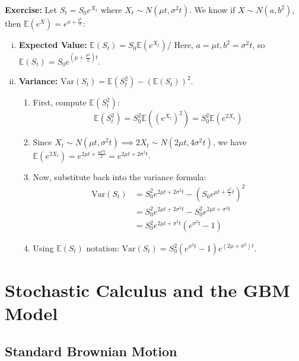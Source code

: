 \textbf{Exercise: } Let \(S_t = S_0 e^{X_t}\) where \(X_t \sim N(\mu t, \sigma^2 t)\). We know if \(X \sim N(a, b^2)\), then \(\mathbb{E}(e^X) = e^{a + \frac{b^2}{2}}\):
\begin{enumerate}[i.]
    \item \textbf{Expected Value: } \(\mathbb{E}(S_t) = S_0 \mathbb{E}(e^{X_t})\)/ Here, \(a = \mu t, b^2 = \sigma^2t\), so \(\mathbb{E}(S_t) = \boxed{S_0 e^{(\mu + \frac{\sigma^2}{2})t}}\).

    \item \textbf{Variance: } \(\text{Var}(S_t) = \mathbb{E}(S_t^2) - (\mathbb{E}(S_t))^2\).
    \begin{enumerate}
        \item First, compute \(\mathbb{E}(S_t^2)\):
        \begin{equation*}
        \mathbb{E}(S_t^2) = S_0^2 \mathbb{E}((e^{X_t})^2) = S_0^2 \mathbb{E}(e^{2X_t})
        \end{equation*}

        \item Since \(X_t \sim N(\mu t, \sigma^2 t) \implies 2X_t \sim N(2\mu t, 4\sigma^2 t)\), we have \(\mathbb{E}(e^{2X_t}) = e^{2\mu t + \frac{4\sigma^2 t}{2}} = e^{2\mu t + 2\sigma^2 t}\).

        \item Now, substitute back into the variance formula:
        \begin{align*}
            \text{Var}(S_t) &= S_0^2 e^{2\mu t + 2\sigma^2 t} - \left( S_0 e^{\mu t + \frac{\sigma^2}{2}t} \right)^2 \\
            &= S_0^2 e^{2\mu t + 2\sigma^2 t} - S_0^2 e^{2\mu t + \sigma^2 t} \\
            &= S_0^2 e^{2\mu t + \sigma^2 t} (e^{\sigma^2 t} - 1)
        \end{align*}

        \item Using \(\mathbb{E}(S_t)\) notation: \(            \boxed{\text{Var}(S_t) = S_0^2 (e^{\sigma^2 t} - 1) e^{(2\mu + \sigma^2)t}}\).
    \end{enumerate}
\end{enumerate}

\section{Stochastic Calculus and the GBM Model}
\subsection{Standard Brownian Motion}

